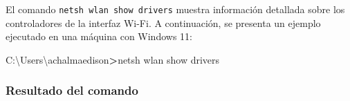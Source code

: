 \documentclass[
  doc,
  floatsintext,
  longtable,
  a4paper,
  nolmodern,
  notxfonts,
  notimes,
  colorlinks=true,linkcolor=blue,citecolor=blue,urlcolor=blue]{apa7}
\newenvironment{Shaded}{\begin{snugshade}}{\end{snugshade}}
\newcommand{\KeywordTok}[1]{\textcolor[rgb]{0.00,0.23,0.31}{\textbf{#1}}}
\newcommand{\NormalTok}[1]{\textcolor[rgb]{0.00,0.23,0.31}{#1}}
\begin{document}
El comando \texttt{netsh\ wlan\ show\ drivers} muestra información
detallada sobre los controladores de la interfaz Wi-Fi. A continuación,
se presenta un ejemplo ejecutado en una máquina con Windows 11:

\begin{Shaded}
\begin{Highlighting}[]
\NormalTok{C:\textbackslash{}Users\textbackslash{}achalmaedison}\KeywordTok{\textgreater{}}\NormalTok{netsh wlan show drivers}
\end{Highlighting}
\end{Shaded}

\subsubsection{Resultado del comando}\label{resultado-del-comando}
\end{document}

